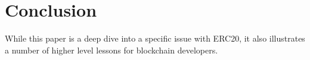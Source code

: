
\section{Conclusion}

While this paper is a deep dive into a specific issue with ERC20, it also illustrates a number of higher level lessons for blockchain developers. 

